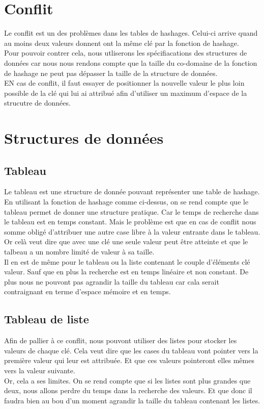 \documentclass[a4paper, 9pt]{article}
\begin{document}
\section{Conflit}
    Le conflit est un des problèmes dans les tables de hashages. Celui-ci arrive quand au moins deux valeurs donnent ont la même clé par la fonction de hashage.\\
    Pour pouvoir contrer cela, nous utliserons les spécifiacations des structures de données car nous nous rendons compte que la taille du co-domaine de la fonction de hashage ne peut pas dépasser la taille de la structure de données.\\
    EN cas de conflit, il faut essayer de positionner la nouvelle valeur le plus loin possible de la clé qui lui ai attribué afin d'utiliser un maximum d'espace de la strucutre de données.\\

\section{Structures de données}
    \subsection{Tableau}
    Le tableau est une structure de donnée pouvant représenter une table de hashage.\\
    En utilisant la fonction de hashage comme ci-dessus, on se rend compte que le tableau permet de donner une structure pratique.
    Car le temps de recherche dans le tableau est en temps constant. Mais le problème est que en cas de conflit nous somme obligé d'attribuer une autre case libre à la valeur entrante dans le tableau.\\
    Or celà veut dire que avec une clé une seule valeur peut être atteinte et que le talbeau a un nombre limité de valeur à sa taille.\\
    Il en est de même pour le tableau ou la liste contenant le couple d'éléments clé valeur. Sauf que en plus la recherche est en temps linéaire et non constant.
    De plus nous ne pouvont pas agrandir la taille du tableau car cala serait contraignant en terme d'espace mémoire et en temps.
    \subsection{Tableau de liste}
    Afin de pallier à ce conflit, nous pouvont utiliser des listes pour stocker les valeurs de chaque clé. Cela veut dire que les cases du tableau vont pointer vers la première valeur qui leur est attribuée. Et que ces valeurs pointeront elles mêmes vers la valeur suivante.\\
    Or, cela a ses limites. On se rend compte que si les listes sont plus grandes que deux, nous allons perdre du temps dans la recherche des valeurs. Et que donc il faudra bien au bou d'un moment agrandir la taille du tableau contenant les listes.\\
\end{document}
